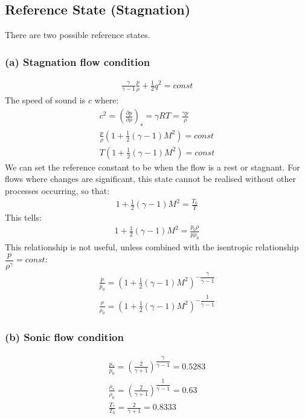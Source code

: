 \subsection{Reference State (Stagnation)}
There are two possible reference states.
\subsubsection{(a) Stagnation flow condition}
\begin{gather}
    \frac{\gamma}{\gamma - 1} \frac{p}{\rho} + \frac{1}{2}q^2 = const
\end{gather}
The speed of sound is $c$ where:
\begin{gather}
    c^2 = \left( \frac{\partial p}{\partial \rho} \right)_s = \gamma R T = \frac{\gamma p}{\rho} \\[5pt]
    \frac{p}{\rho} \left( 1 + \frac{1}{2}(\gamma-1)M^2 \right) = const \\[5pt]
    T \left( 1 + \frac{1}{2}(\gamma - 1)M^2 \right) = const
\end{gather}
We can set the reference constant to be when the flow is a rest or stagnant. For flows where changes are significant, this state cannot be realised without other processes occurring, so that:
\begin{gather}
    1 + \frac{1}{2}(\gamma - 1)M^2 = \frac{T_0}{T}
\end{gather}
This tells:
\begin{gather}
    1 + \frac{1}{2}(\gamma - 1)M^2 = \frac{p_0 \rho}{p \rho_0}
\end{gather}
This relationship is not useful, unless combined with the isentropic relationship $\dfrac{p}{\rho^{\gamma}} = const$:
\begin{gather}
    \frac{p}{p_0} = \left( 1 + \frac{1}{2}(\gamma-1)M^2 \right)^{-\dfrac{\gamma}{\gamma-1}} \\[5pt]
    \frac{\rho}{\rho_0} = \left( 1 + \frac{1}{2}(\gamma-1)M^2 \right)^{-\dfrac{1}{\gamma-1}}
\end{gather}
\subsubsection{(b) Sonic flow condition}
\begin{gather}
    \frac{p_{*}}{p_0} = \left( \frac{2}{\gamma+1} \right)^{\dfrac{\gamma}{\gamma-1}} = 0.5283 \\[5pt]
    \frac{\rho_{*}}{\rho_0} = \left( \frac{2}{\gamma+1} \right)^{\dfrac{1}{\gamma-1}} = 0.63 \\[5pt]
    \frac{T_{*}}{T_0} = \frac{2}{\gamma+1} = 0.8333
\end{gather}
